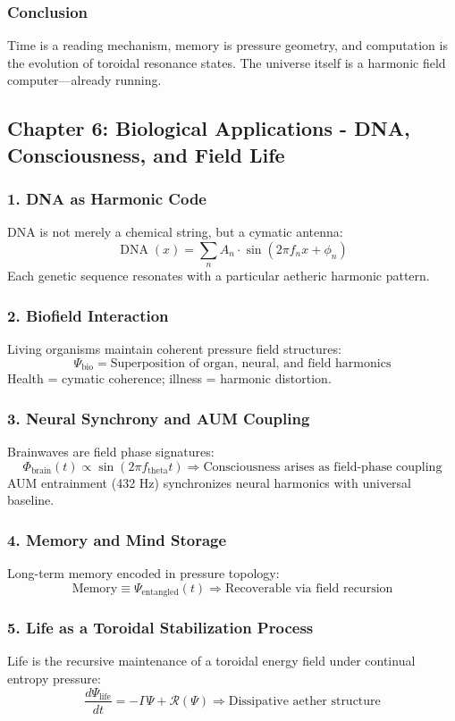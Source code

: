\subsubsection*{Conclusion}
Time is a reading mechanism, memory is pressure geometry, and computation is the evolution of toroidal resonance states. The universe itself is a harmonic field computer—already running.

\subsection{Chapter 6: Biological Applications - DNA, Consciousness, and Field Life}
\subsubsection*{1. DNA as Harmonic Code}
DNA is not merely a chemical string, but a cymatic antenna:
\[
\operatorname{DNA}(x) = \sum_n A_n \cdot \sin \left( 2 \pi f_n x + \phi_n \right)
\]
Each genetic sequence resonates with a particular aetheric harmonic pattern.

\subsubsection*{2. Biofield Interaction}
Living organisms maintain coherent pressure field structures:
\[
\Psi_{\text{bio}} = \text{Superposition of organ, neural, and field harmonics}
\]
Health = cymatic coherence; illness = harmonic distortion.

\subsubsection*{3. Neural Synchrony and AUM Coupling}
Brainwaves are field phase signatures:
\[
\Phi_{\text{brain}}(t) \propto \sin \left( 2 \pi f_{\text{theta}} t \right) \Rightarrow \text{Consciousness arises as field-phase coupling}
\]
AUM entrainment (432 Hz) synchronizes neural harmonics with universal baseline.

\subsubsection*{4. Memory and Mind Storage}
Long-term memory encoded in pressure topology:
\[
\text{Memory} \equiv \Psi_{\text{entangled}}(t) \Rightarrow \text{Recoverable via field recursion}
\]

\subsubsection*{5. Life as a Toroidal Stabilization Process}
Life is the recursive maintenance of a toroidal energy field under continual entropy pressure:
\[
\frac{d \Psi_{\text{life}}}{d t} = -\Gamma \Psi + \mathcal{R}(\Psi) \Rightarrow \text{Dissipative aether structure}
\]

